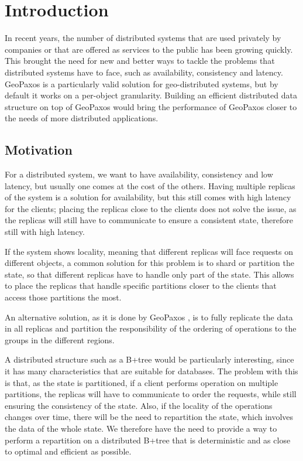 \chapter{Introduction}\label{sec:introduction}
In recent years, the number of distributed systems that are used privately by companies or that are offered as services to the public has been growing quickly. This brought the need for new and better ways to tackle the problems that distributed systems have to face, such as availability, consistency and latency. GeoPaxos \citep{geopaxos} is a particularly valid solution for geo-distributed systems, but by default it works on a per-object granularity. Building an efficient distributed data structure on top of GeoPaxos would bring the performance of GeoPaxos closer to the needs of more distributed applications.

\section{Motivation}\label{sec:motivation}
For a distributed system, we want to have availability, consistency and low latency, but usually one comes at the cost of the others. Having multiple replicas of the system is a solution for availability, but this still comes with high latency for the clients; placing the replicas close to the clients does not solve the issue, as the replicas will still have to communicate to ensure a consistent state, therefore still with high latency.

If the system shows locality, meaning that different replicas will face requests on different objects, a common solution for this problem is to shard or partition the state, so that different replicas have to handle only part of the state. This allows to place the replicas that handle specific partitions closer to the clients that access those partitions the most.

An alternative solution, as it is done by GeoPaxos \citep{geopaxos}, is to fully replicate the data in all replicas and partition the responsibility of the ordering of operations to the groups in the different regions.

A distributed structure such as a B+tree would be particularly interesting, since it has many characteristics that are suitable for databases. The problem with this is that, as the state is partitioned, if a client performs operation on multiple partitions, the replicas will have to communicate to order the requests, while still ensuring the consistency of the state. Also, if the locality of the operations changes over time, there will be the need to repartition the state, which involves the data of the whole state. We therefore have the need to provide a way to perform a repartition on a distributed B+tree that is deterministic and as close to optimal and efficient as possible.

